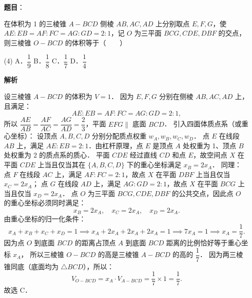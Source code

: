 \begin{answer}

\textbf{题目}：

在体积为 1 的三棱锥 $A - BCD$ 侧棱 $AB, AC, AD$ 上分别取点 $E, F, G$，使 $AE:EB = AF:FC = AG:GD = 2:1$，记 $O$ 为三平面 $BCG, CDE, DBF$ 的交点，则三棱锥 $O - BCD$ 的体积等于\mbox{（　　）}

\begin{gkopts}(4)
\task A．$\dfrac{1}{9}$
\task B．$\dfrac{1}{8}$
\task C．$\dfrac{1}{7}$
\task D．$\dfrac{1}{4}$
\end{gkopts}

\textbf{解析}

设三棱锥 $A - BCD$ 的体积为 $V = 1$．
因为 $E, F, G$ 分别在侧棱 $AB, AC, AD$ 上，且满足：
\nopagebreak[4]
\[
AE : EB = AF : FC = AG : GD = 2 : 1,
\]
所以 $\dfrac{AE}{AB} = \dfrac{AF}{AC} = \dfrac{AG}{AD} = \dfrac{2}{3}$，平面 $EFG \parallel$ 底面 $BCD$．
引入四面体质点系（或重心坐标）：
设顶点 $A, B, C, D$ 分别分配质点权重 $w_A, w_B, w_C, w_D$．
点 $E$ 在线段 $AB$ 上，满足 $AE : EB = 2 : 1$．由杠杆原理，点 $E$ 是顶点 $A$ 处权重为 1、顶点 $B$ 处权重为 2 的质点系的质心．
平面 $CDE$ 经过直线 $CD$ 和点 $E$，故空间点 $X$ 在平面 $CDE$ 上当且仅当其在 $\{A, B, C, D\}$ 下的重心坐标满足 $x_B = 2x_A$．
同理：
点 $F$ 在线段 $AC$ 上，满足 $AF : FC = 2 : 1$，故点 $X$ 在平面 $DBF$ 上当且仅当 $x_C = 2x_A$；
点 $G$ 在线段 $AD$ 上，满足 $AG : GD = 2 : 1$，故点 $X$ 在平面 $BCG$ 上当且仅当 $x_D = 2x_A$．
点 $O$ 为三平面 $BCG, CDE, DBF$ 的公共交点，因此点 $O$ 的重心坐标必须同时满足：
\nopagebreak[4]
\[
x_B = 2x_A, \quad x_C = 2x_A, \quad x_D = 2x_A.
\]
由重心坐标的归一化条件：
\nopagebreak[4]
\[
x_A + x_B + x_C + x_D = 1 \implies x_A + 2x_A + 2x_A + 2x_A = 1 \implies 7x_A = 1 \implies x_A = \frac{1}{7}.
\]
因为点 $O$ 到底面 $BCD$ 的距离占顶点 $A$ 到底面 $BCD$ 距离的比例恰好等于重心坐标 $x_A$，
所以三棱锥 $O - BCD$ 的高是三棱锥 $A - BCD$ 的高的 $\dfrac{1}{7}$．
因为两三棱锥同底（底面均为 $\triangle BCD$），所以：
\nopagebreak[4]
\[
V_{O-BCD} = x_A \cdot V_{A-BCD} = \frac{1}{7} \times 1 = \frac{1}{7}.
\]
故选 C．


\end{answer}
